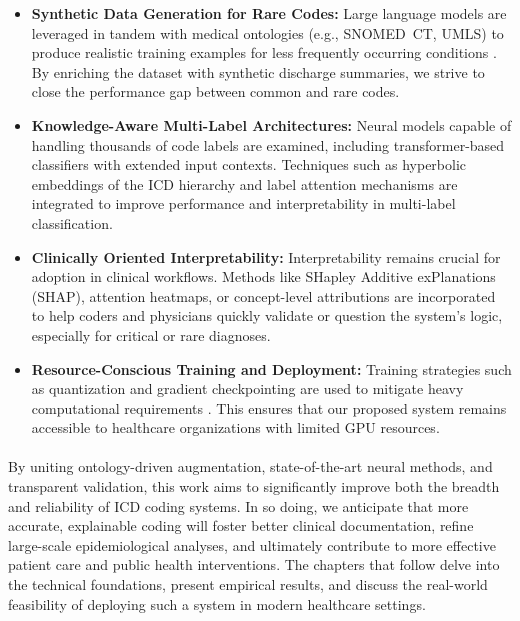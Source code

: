 \begin{itemize}
    \item \textbf{Synthetic Data Generation for Rare Codes:} Large language models are leveraged in tandem with medical ontologies (e.g., SNOMED~CT, UMLS) to produce realistic training examples for less frequently occurring conditions \citep{kumichev2024medsyn,falis2022horsestozebras}. By enriching the dataset with synthetic discharge summaries, we strive to close the performance gap between common and rare codes.

    \item \textbf{Knowledge-Aware Multi-Label Architectures:} Neural models capable of handling thousands of code labels are examined, including transformer-based classifiers with extended input contexts. Techniques such as hyperbolic embeddings of the ICD hierarchy \citep{nickel2017poincare,cao2020hypercore} and label attention mechanisms \citep{vu2020ijcai} are integrated to improve performance and interpretability in multi-label classification.

    \item \textbf{Clinically Oriented Interpretability:} Interpretability remains crucial for adoption in clinical workflows. Methods like SHapley Additive exPlanations (SHAP), attention heatmaps, or concept-level attributions \citep{holzinger2017we,teng2020explainable} are incorporated to help coders and physicians quickly validate or question the system’s logic, especially for critical or rare diagnoses.

    \item \textbf{Resource-Conscious Training and Deployment:} Training strategies such as quantization and gradient checkpointing are used to mitigate heavy computational requirements \citep{geiping2023cramming}. This ensures that our proposed system remains accessible to healthcare organizations with limited GPU resources.
\end{itemize}

\paragraph{}
By uniting ontology-driven augmentation, state-of-the-art neural methods, and transparent validation, this work aims to significantly improve both the breadth and reliability of ICD coding systems. In so doing, we anticipate that more accurate, explainable coding will foster better clinical documentation, refine large-scale epidemiological analyses, and ultimately contribute to more effective patient care and public health interventions. The chapters that follow delve into the technical foundations, present empirical results, and discuss the real-world feasibility of deploying such a system in modern healthcare settings.
